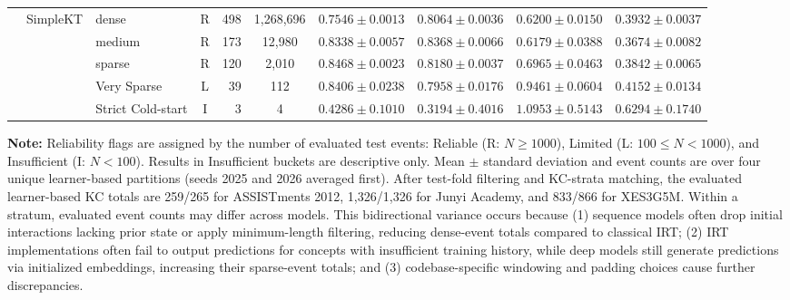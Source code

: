 \begin{table}[tbp]
{\begin{tabular}{lllcrccccc}
 & SimpleKT & dense & R & 498 & 1,268,696 & $0.7546 \pm 0.0013$ & $0.8064 \pm 0.0036$ & $0.6200 \pm 0.0150$ & $0.3932 \pm 0.0037$ \\
 &  & medium & R & 173 & 12,980 & $0.8338 \pm 0.0057$ & $0.8368 \pm 0.0066$ & $0.6179 \pm 0.0388$ & $0.3674 \pm 0.0082$ \\
 &  & sparse & R & 120 & 2,010 & $0.8468 \pm 0.0023$ & $0.8180 \pm 0.0037$ & $0.6965 \pm 0.0463$ & $0.3842 \pm 0.0065$ \\
 &  & Very Sparse & L & 39 & 112 & $0.8406 \pm 0.0238$ & $0.7958 \pm 0.0176$ & $0.9461 \pm 0.0604$ & $0.4152 \pm 0.0134$ \\
 &  & Strict Cold-start & I & 3 & 4 & $0.4286 \pm 0.1010$ & $0.3194 \pm 0.4016$ & $1.0953 \pm 0.5143$ & $0.6294 \pm 0.1740$ \\
\bottomrule

\end{tabular}%
}

\vspace{1ex}
{\scriptsize \textbf{Note:} Reliability flags are assigned by the number of evaluated test events: Reliable (R: $N \ge 1000$), Limited (L: $100 \le N < 1000$), and Insufficient (I: $N < 100$). Results in Insufficient buckets are descriptive only. Mean $\pm$ standard deviation and event counts are over four unique learner-based partitions (seeds 2025 and 2026 averaged first). After test-fold filtering and KC-strata matching, the evaluated learner-based KC totals are 259/265 for ASSISTments 2012, 1,326/1,326 for Junyi Academy, and 833/866 for XES3G5M. Within a stratum, evaluated event counts may differ across models. This bidirectional variance occurs because (1) sequence models often drop initial interactions lacking prior state or apply minimum-length filtering, reducing dense-event totals compared to classical IRT; (2) IRT implementations often fail to output predictions for concepts with insufficient training history, while deep models still generate predictions via initialized embeddings, increasing their sparse-event totals; and (3) codebase-specific windowing and padding choices cause further discrepancies.\par}

\end{table}

